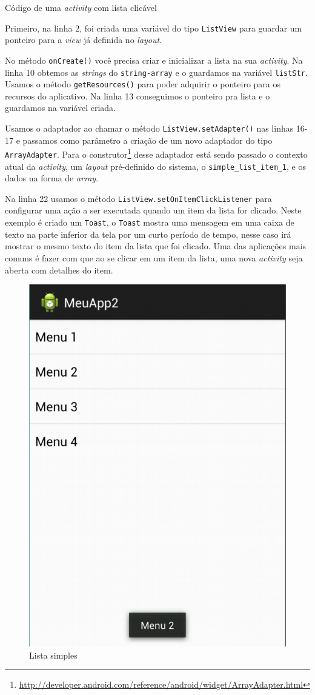 \documentclass[a4paper,12pt,brazil,oneside]{book}
\begin{document}
\begin{singlespace}
\begin{listing}[H]
\inputminted[linenos=true,fontsize=\small,frame=lines, framesep=2mm, tabsize=2,numbersep=5pt]{java}{src/design/listactivity.java}
\caption{Código de uma \emph{activity} com lista clicável}
\label{code:activity-lista}
\end{listing}

Primeiro, na linha 2, foi criada uma variável do tipo \texttt{ListView} para guardar um ponteiro para a \emph{view} já definida no \emph{layout}.

No método \texttt{onCreate()} você precisa criar e inicializar a lista na sua \emph{activity}. Na linha 10 obtemos as \emph{strings} do \texttt{string-array} e o guardamos na variável \texttt{listStr}. Usamos o método \texttt{getResources()} para poder adquirir o ponteiro para os recursos do aplicativo. Na linha 13 conseguimos o ponteiro pra lista e o guardamos na variável criada.

Usamos o adaptador ao chamar o método \texttt{ListView.setAdapter()} nas linhas 16-17  e passamos como parâmetro a criação de um novo adaptador do tipo \texttt{ArrayAdapter}. Para o construtor\footnote{\href{http://developer.android.com/reference/android/widget/ArrayAdapter.html}{http://developer.android.com/reference/android/widget/ArrayAdapter.html}} desse adaptador está sendo passado o contexto atual da \emph{activity}, um \emph{layout} pré-definido do sistema, o \texttt{simple\_list\_item\_1}, e os dados na forma de \emph{array}.

Na linha 22 usamos o método \texttt{ListView.setOnItemClickListener} para configurar uma ação a ser executada quando um item da lista for clicado. Neste exemplo é criado um \texttt{Toast}, o \texttt{Toast} mostra uma mensagem em uma caixa de texto na parte inferior da tela por um curto período de tempo, nesse caso irá mostrar o mesmo texto do item da lista que foi clicado. Uma das aplicações mais comuns é fazer com que ao se clicar em um item da lista, uma nova \emph{activity} seja aberta com detalhes do item.

\begin{figure}[H]
  \centering
  \includegraphics[width=.4\textwidth]{figuras/design/lista.png}
  \caption{Lista simples}
  \label{fig:e10}
\end{figure}


\end{singlespace}
\end{document}
